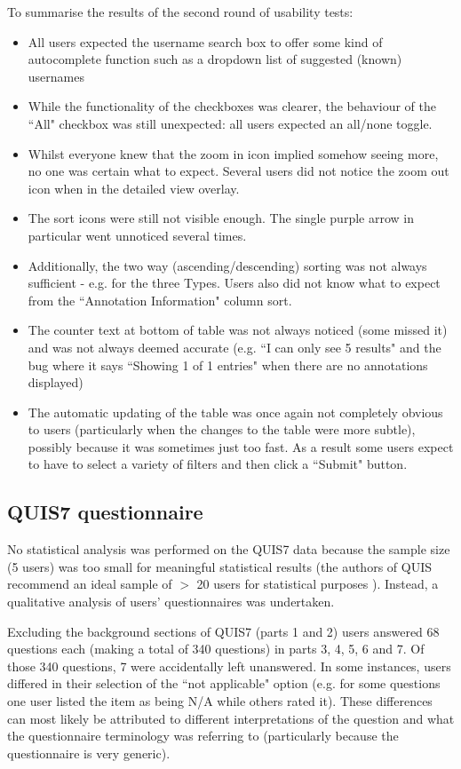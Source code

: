 To summarise the results of the second round of usability tests:
\begin{itemize}
\item All users expected the username search box to offer some kind of autocomplete function such as a dropdown list of suggested (known) usernames
\item While the functionality of the checkboxes was clearer, the behaviour of the ``All" checkbox was still unexpected: all users expected an all/none toggle. 
\item Whilst everyone knew that the zoom in icon implied somehow seeing more, no one was certain what to expect. Several users did not notice the zoom out icon when in the detailed view overlay.
\item The sort icons were still not visible enough. The single purple arrow in particular went unnoticed several times. \item Additionally, the two way (ascending/descending) sorting was not always sufficient - e.g. for the three Types. Users also did not know what to expect from the ``Annotation Information" column sort.
\item The counter text at bottom of table was not always noticed (some missed it) and was not always deemed accurate (e.g. ``I can only see 5 results" and the bug where it says ``Showing 1 of 1 entries" when there are no annotations displayed)
\item The automatic updating of the table was once again not completely obvious to users (particularly when the changes to the table were more subtle), possibly because it was sometimes just too fast. As a result some users expect to have to select a variety of filters and then click a ``Submit" button. 
\end{itemize}

\subsection{QUIS7 questionnaire}
No statistical analysis was performed on the QUIS7 data because the sample size (5 users) was too small for meaningful statistical results (the authors of QUIS recommend an ideal sample of $>$ 20 users for statistical purposes \citep{QUISquant}). Instead, a qualitative analysis of users' questionnaires was undertaken. 

Excluding the background sections of QUIS7 (parts 1 and 2) users answered 68 questions each (making a total of 340 questions) in parts 3, 4, 5, 6 and 7. Of those 340 questions, 7 were accidentally left unanswered. In some instances, users differed in their selection of the ``not applicable" option (e.g. for some questions one user listed the item as being N/A while others rated it). These differences can most likely be attributed to different interpretations of the question and what the questionnaire terminology was referring to (particularly because the questionnaire is very generic).

